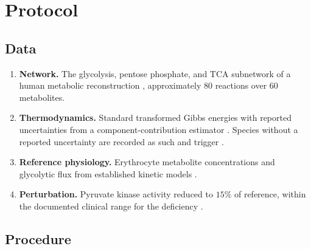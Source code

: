 \documentclass[11pt,twocolumn,a4paper]{article}
\theoremstyle{pstyle}
\theoremstyle{definition}
\theoremstyle{remark}
\begin{document}
\section{Protocol}
\label{sec:protocol}

\subsection{Data}

\begin{enumerate}[leftmargin=1.5em,itemsep=2pt]
\item \textbf{Network.} The glycolysis, pentose phosphate, and TCA
subnetwork of a human metabolic reconstruction
\citep{brunk2018}, approximately $80$ reactions over $60$ metabolites.
\item \textbf{Thermodynamics.} Standard transformed Gibbs energies with
reported uncertainties from a component-contribution estimator
\citep{noor2013,flamholz2012}. Species without a reported uncertainty
are recorded as such and trigger .
\item \textbf{Reference physiology.} Erythrocyte metabolite
concentrations and glycolytic flux from established kinetic models
\citep{rapoport1975,mulquiney1999}.
\item \textbf{Perturbation.} Pyruvate kinase activity reduced to
$15\%$ of reference, within the documented clinical range for the
deficiency \citep{zanella2005}.
\end{enumerate}

\subsection{Procedure}
\end{document}
